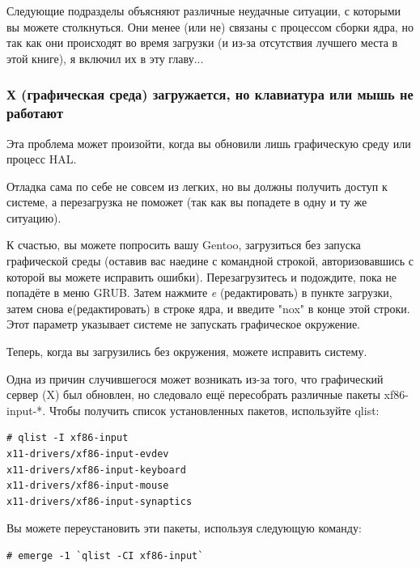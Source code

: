 \documentclass[10pt]{book}
\begin{document}
Следующие подразделы объясняют различные неудачные ситуации, с которыми вы можете столкнуться. Они менее (или не) связаны с процессом сборки ядра, но так как они происходят во время загрузки (и из-за отсутствия лучшего места в этой книге), я включил их в эту главу...

\subsubsection{Х (графическая среда) загружается, но клавиатура или мышь не работают}

Эта проблема может произойти, когда вы обновили лишь графическую среду или процесс HAL.

Отладка сама по себе не совсем из легких, но вы должны получить доступ к  системе, а перезагрузка не поможет (так как вы попадете в одну и ту же ситуацию).

К счастью, вы можете попросить вашу Gentoo, загрузиться без запуска графической среды (оставив вас наедине с командной строкой, авторизовавшись с которой вы можете исправить ошибки). Перезагрузитесь и подождите,  пока не попадёте в меню GRUB. Затем нажмите \textit{e} (редактировать) в пункте загрузки, затем снова е(редактировать) в строке ядра, и введите "nox" в конце этой строки. Этот параметр указывает системе не запускать графическое окружение.

Теперь, когда вы загрузились без окружения, можете исправить систему.

Одна из причин случившегося может возникать из-за того, что графический сервер (X) был обновлен, но следовало ещё пересобрать различные пакеты xf86-input-*. Чтобы получить список установленных пакетов, используйте qlist:

\vspace{3mm}
\begin{tcolorbox}
\begin{lstlisting}
# qlist -I xf86-input
x11-drivers/xf86-input-evdev
x11-drivers/xf86-input-keyboard
x11-drivers/xf86-input-mouse
x11-drivers/xf86-input-synaptics
\end{lstlisting}
\end{tcolorbox}

Вы можете переустановить эти пакеты, используя следующую команду:

\begin{tcolorbox}
\begin{lstlisting}
# emerge -1 `qlist -CI xf86-input`
\end{lstlisting}
\end{tcolorbox}
\end{document}
